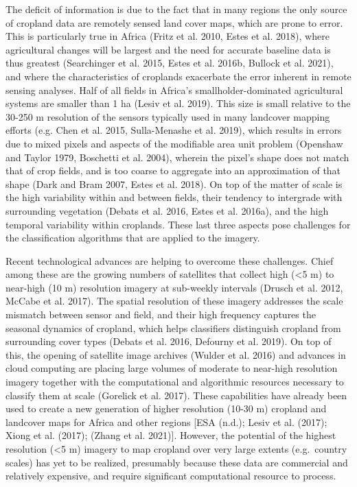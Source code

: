 \documentclass[11pt,a4paper]{article}
\begin{document}
The deficit of information is due to the fact that in many regions the
only source of cropland data are remotely sensed land cover maps, which
are prone to error. This is particularly true in Africa (Fritz et al.
2010, Estes et al. 2018), where agricultural changes will be largest and
the need for accurate baseline data is thus greatest (Searchinger et al.
2015, Estes et al. 2016b, Bullock et al. 2021), and where the
characteristics of croplands exacerbate the error inherent in remote
sensing analyses. Half of all fields in Africa's smallholder-dominated
agricultural systems are smaller than 1 ha (Lesiv et al. 2019). This
size is small relative to the 30-250 m resolution of the sensors
typically used in many landcover mapping efforts (e.g. Chen et al. 2015,
Sulla-Menashe et al. 2019), which results in errors due to mixed pixels
and aspects of the modifiable area unit problem (Openshaw and Taylor
1979, Boschetti et al. 2004), wherein the pixel's shape does not match
that of crop fields, and is too coarse to aggregate into an
approximation of that shape (Dark and Bram 2007, Estes et al. 2018). On
top of the matter of scale is the high variability within and between
fields, their tendency to intergrade with surrounding vegetation (Debats
et al. 2016, Estes et al. 2016a), and the high temporal variability
within croplands. These last three aspects pose challenges for the
classification algorithms that are applied to the imagery.

Recent technological advances are helping to overcome these challenges.
Chief among these are the growing numbers of satellites that collect
high (\textless5 m) to near-high (10 m) resolution imagery at sub-weekly
intervals (Drusch et al. 2012, McCabe et al. 2017). The spatial
resolution of these imagery addresses the scale mismatch between sensor
and field, and their high frequency captures the seasonal dynamics of
cropland, which helps classifiers distinguish cropland from surrounding
cover types (Debats et al. 2016, Defourny et al. 2019). On top of this,
the opening of satellite image archives (Wulder et al. 2016) and
advances in cloud computing are placing large volumes of moderate to
near-high resolution imagery together with the computational and
algorithmic resources necessary to classify them at scale (Gorelick et
al. 2017). These capabilities have already been used to create a new
generation of higher resolution (10-30 m) cropland and landcover maps
for Africa and other regions {[}ESA (n.d.); Lesiv et al. (2017); Xiong
et al. (2017); (Zhang et al. 2021){]}. However, the potential of the
highest resolution (\textless5 m) imagery to map cropland over very
large extents (e.g.~country scales) has yet to be realized, presumably
because these data are commercial and relatively expensive, and require
significant computational resource to process.
\end{document}
